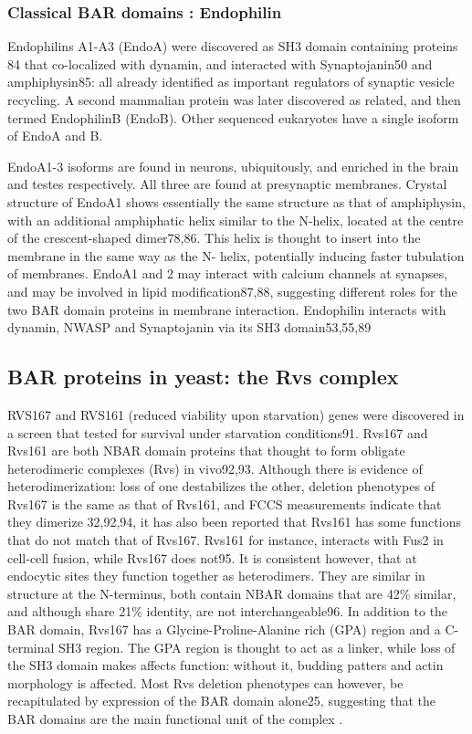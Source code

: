 		\subsubsection{Classical BAR domains : Endophilin}
		Endophilins A1-A3 (EndoA) were discovered as SH3 domain containing proteins 84 that co-localized with dynamin, and interacted with Synaptojanin50 and amphiphysin85: all already identified as important regulators of synaptic vesicle recycling. A second mammalian protein was later discovered as related, and then termed EndophilinB (EndoB). Other sequenced eukaryotes have a single isoform of EndoA and B.

		\vspace{5mm}
		EndoA1-3 isoforms are found in neurons, ubiquitously, and enriched in the brain and testes respectively. All three are found at presynaptic membranes. Crystal structure of EndoA1 shows essentially the same structure as that of amphiphysin, with an additional amphiphatic helix similar to the N-helix, located at the centre of the crescent-shaped dimer78,86. This helix is thought to insert into the membrane in the same way as the N- helix, potentially inducing faster tubulation of membranes. EndoA1 and 2 may interact with calcium channels at synapses, and may be involved in lipid modification87,88, suggesting different roles for the two BAR domain proteins in membrane interaction. Endophilin interacts with dynamin, NWASP and Synaptojanin via its SH3 domain53,55,89


		\subsection{BAR proteins in yeast: the Rvs complex}		
		RVS167 and RVS161 (reduced viability upon starvation) genes were discovered in a screen that tested for survival under starvation conditions91. Rvs167 and Rvs161 are both NBAR domain proteins that thought to form obligate heterodimeric complexes (Rvs) in vivo92,93. Although there is evidence of heterodimerization: loss of one destabilizes the other, deletion phenotypes of Rvs167 is the same as that of Rvs161, and FCCS measurements indicate that they dimerize 32,92,94, it has also been reported that Rvs161 has some functions that do not match that of Rvs167. Rvs161 for instance, interacts with Fus2 in cell-cell fusion, while Rvs167 does not95. It is consistent however, that at endocytic sites they function together as heterodimers. 
		They are similar in structure at the N-terminus, both contain NBAR domains that are 42\% similar, and although share 21\% identity, are not interchangeable96. In addition to the BAR domain, Rvs167 has a Glycine-Proline-Alanine rich (GPA) region and a C-terminal SH3 region. The GPA region is thought to act as a linker, while loss of the SH3 domain makes affects function: without it, budding patters and actin morphology is affected. Most Rvs deletion phenotypes can however, be recapitulated by expression of the BAR domain alone25, suggesting that the BAR domains are the main functional unit of the complex .
		
